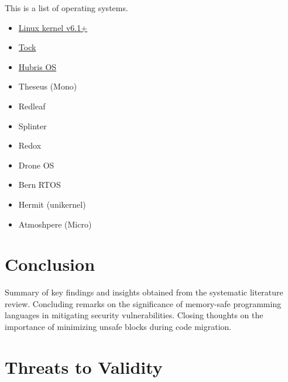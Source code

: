 \documentclass[sigconf]{acmart}
\begin{document}
This is a list of operating systems.
\begin{itemize}
\item \href{https://docs.kernel.org/rust/}{Linux kernel v6.1+}
\item \href{https://github.com/tock/tock}{Tock}
\item \href{https://hubris.oxide.computer/}{Hubris OS}
\item Theseus (Mono)
\item Redleaf
\item Splinter
\item Redox
\item Drone OS
\item Bern RTOS
\item Hermit (unikernel)
  \item Atmoshpere (Micro)
\end{itemize}

\section{Conclusion}

Summary of key findings and insights obtained from the systematic literature review.
Concluding remarks on the significance of memory-safe programming languages in mitigating security vulnerabilities.
Closing thoughts on the importance of minimizing unsafe blocks during code migration.

\section{Threats to Validity}
\balance



\end{document}
